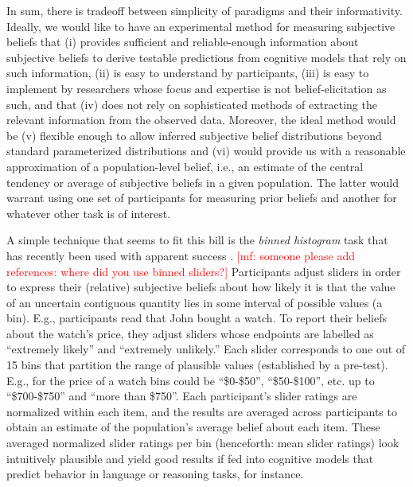 \documentclass[10pt,letterpaper]{article}
\newcommand{\mf}[1]{\textcolor{Red}{[mf: #1]}}
\newcommand{\citep}[1]{\cite{#1}}
\begin{document}
In sum, there is tradeoff between simplicity of paradigms and their informativity. Ideally, we
would like to have an experimental method for measuring subjective beliefs that (i) provides
sufficient and reliable-enough information about subjective beliefs to derive testable
predictions from cognitive models that rely on such information, (ii) is easy to understand by
 participants, (iii) is easy to implement by researchers whose focus and expertise is not
belief-elicitation as such, and that (iv) does not rely on sophisticated methods of extracting
the relevant information from the observed data. Moreover, the ideal method would be (v)
flexible enough to allow inferred subjective belief distributions beyond standard parameterized
distributions and (vi) would provide us with a reasonable approximation of a population-level
belief, i.e., an estimate of the central tendency or average of subjective beliefs in a given
population. The latter would warrant using one set of participants for measuring prior beliefs and
another for whatever other task is of interest.



A simple technique that seems to fit this bill is the \emph{binned histogram} task that has
recently been used with apparent success
\citep{KaoWu2014:Nonliteral-Unde,SchollerFranke2015:Semantic-values}. \mf{someone please add
  references: where did you use binned sliders?} Participants adjust sliders in order to
express their (relative) subjective beliefs about how likely it is that the value of an
uncertain contiguous quantity lies in some interval of possible values (a bin). E.g.,
participants read that John bought a watch.  To report their beliefs about the watch's price,
they adjust sliders whose endpoints are labelled as ``extremely likely'' and ``extremely
unlikely.'' Each slider corresponds to one out of 15 bins that partition the range of plausible
values (established by a pre-test). E.g., for the price of a watch bins could be ``\$0-\$50'',
``\$50-\$100'', etc. up to ``\$700-\$750'' and ``more than \$750''. Each participant's slider
ratings are normalized within each item, and the results are averaged across participants to obtain
an estimate of the population's average belief about each item. These averaged normalized
slider ratings per bin (henceforth: mean slider ratings) look intuitively plausible and yield
good results if fed into cognitive models that predict behavior in language or reasoning tasks,
for instance.
\end{document}
